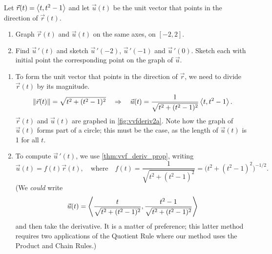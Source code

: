 \begin{example}\label{ex_vvfderiv2}%
Let $\vec r(t) =\left\langle t, t^2-1\right\rangle$ and let $\vec u(t)$ be the unit vector that points in the direction of $\vec r(t)$.
\begin{enumerate}
	\item Graph $\vec r(t)$ and $\vec u(t)$ on the same axes, on $[-2,2]$.
	\item	Find $\vec u\,'(t)$ and sketch $\vec u\,'(-2)$, $\vec u\,'(-1)$ and $\vec u\,'(0)$. Sketch each with initial point the corresponding point on the graph of $\vec u$.
\end{enumerate}
\solution
\begin{enumerate}
	\item To form the unit vector that points in the direction of $\vec r$, we need to divide $\vec r(t)$ by its magnitude. 
	\[\left\lVert \vec r(t) \right\rVert = \sqrt{t^2+(t^2-1)^2} \quad \Rightarrow \quad \vec u(t) = \frac{1}{\sqrt{t^2+(t^2-1)^2}}\left\langle t,t^2-1\right\rangle.\]
%
	$\vec r(t)$ and $\vec u(t)$ are graphed in \autoref{fig:vvfderiv2a}. Note how the graph of $\vec u(t)$ forms part of a circle; this must be the case, as the length of $\vec u(t)$ is 1 for all $t$.

	\item		To compute $\vec u\,'(t)$, we use \autoref{thm:vvf_deriv_prop}, writing
	\[\vec u(t) = f(t)\vec r(t),\quad  \text{where}\quad f(t) = \frac{1}{\sqrt{t^2+(t^2-1)^2}}=\bigl(t^2+(t^2-1)^2\bigr)^{-1/2}.\]
	(We \emph{could} write
	\[\vec u(t) =\left\langle \frac{t}{\sqrt{t^2+(t^2-1)^2}}, \frac{t^2-1}{\sqrt{t^2+(t^2-1)^2}}\right\rangle\]
	and then take the derivative. It is a matter of preference; this latter method requires two applications of the Quotient Rule where our method uses the Product and Chain Rules.)
	

\end{enumerate}
\end{example}
